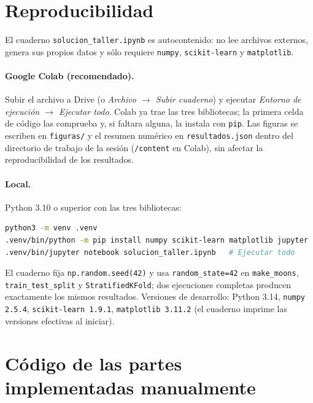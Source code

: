 \documentclass[11pt,a4paper]{article}
\begin{document}
\section*{Reproducibilidad}

El cuaderno \texttt{solucion\_taller.ipynb} es autocontenido: no lee archivos
externos, genera sus propios datos y sólo requiere \texttt{numpy},
\texttt{scikit-learn} y \texttt{matplotlib}.

\paragraph{Google Colab (recomendado).} Subir el archivo a Drive (o
\emph{Archivo $\to$ Subir cuaderno}) y ejecutar
\emph{Entorno de ejecución $\to$ Ejecutar todo}. Colab ya trae las tres
bibliotecas; la primera celda de código las comprueba y, si faltara alguna, la
instala con \texttt{pip}. Las figuras se escriben en \texttt{figuras/} y el
resumen numérico en \texttt{resultados.json} dentro del directorio de trabajo de
la sesión (\texttt{/content} en Colab), sin afectar la reproducibilidad de los
resultados.

\paragraph{Local.} Python 3.10 o superior con las tres bibliotecas:

\begin{lstlisting}[language=bash,numbers=none]
python3 -m venv .venv
.venv/bin/python -m pip install numpy scikit-learn matplotlib jupyter
.venv/bin/jupyter notebook solucion_taller.ipynb   # Ejecutar todo
\end{lstlisting}

\noindent
El cuaderno fija \texttt{np.random.seed(42)} y usa \texttt{random\_state=42} en
\texttt{make\_moons}, \texttt{train\_test\_split} y \texttt{StratifiedKFold}; dos
ejecuciones completas producen exactamente los mismos resultados. Versiones de
desarrollo: Python 3.14, \texttt{numpy 2.5.4}, \texttt{scikit-learn 1.9.1},
\texttt{matplotlib 3.11.2} (el cuaderno imprime las versiones efectivas al
iniciar).

\appendix
\section{Código de las partes implementadas manualmente}
\end{document}
